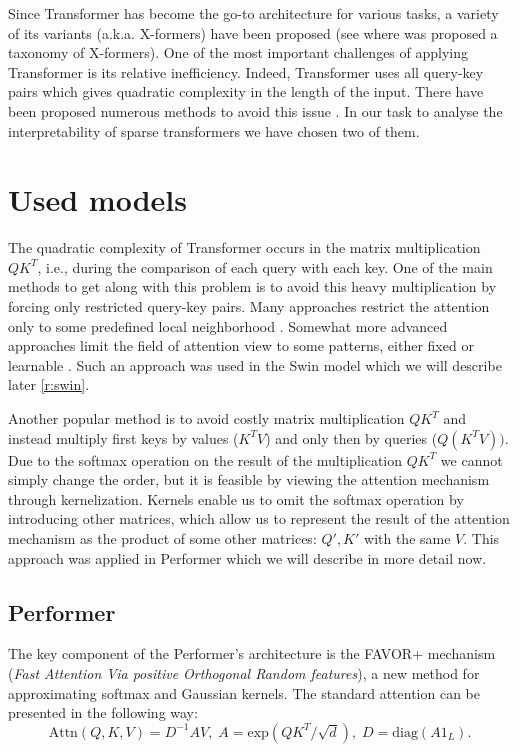 \documentclass[magisterska,en]{pracamgr}
\begin{document}
Since Transformer has become the go-to architecture for various tasks, a variety of its variants (a.k.a. X-formers) have been proposed (see \cite{DBLP:journals/corr/abs-2106-04554} where was proposed a taxonomy of X-formers). One of the most important challenges of applying Transformer is its relative inefficiency. Indeed, Transformer uses all query-key pairs which gives quadratic complexity in the length of the input. There have been proposed numerous methods to avoid this issue \cite{DBLP:journals/csur/TayDBM23}. In our task to analyse the interpretability of sparse transformers we have chosen two of them.

\chapter{Used models}\label{r:sparse_transformers}

The quadratic complexity of Transformer occurs in the matrix multiplication $QK^T$, i.e., during the comparison of each query with each key. One of the main methods to get along with this problem is to avoid this heavy multiplication by forcing only restricted query-key pairs. Many approaches restrict the attention only to some predefined local neighborhood \cite{DBLP:conf/icml/ParmarVUKSKT18}. Somewhat more advanced approaches limit the field of attention view to some patterns, either fixed or learnable \cite{DBLP:journals/csur/TayDBM23}. Such an approach was used in the Swin model \cite{DBLP:conf/iccv/LiuL00W0LG21} which we will describe later \ref{r:swin}.

Another popular method is to avoid costly matrix multiplication $QK^T$ and instead multiply first keys by values ($K^TV$) and only then by queries ($Q(K^TV))$. Due to the softmax operation on the result of the multiplication $QK^T$ we cannot simply change the order, but it is feasible by viewing the attention mechanism through kernelization. Kernels enable us to omit the softmax operation by introducing other matrices, which allow us to represent the result of the attention mechanism as the product of some other matrices: $Q', K'$ with the same $V$. This approach was applied in Performer \cite{DBLP:conf/iclr/ChoromanskiLDSG21} which we will describe in more detail now.


\section{Performer}\label{r:performer}


The key component of the Performer's architecture is the FAVOR+ mechanism (\textit{Fast Attention Via positive Orthogonal Random features}), a new method for approximating softmax and Gaussian kernels. The standard attention can be presented in the following way:
\begin{equation}
    \textrm{Attn}(Q, K, V) = D^{-1}AV, \; A=\textrm{exp}\left(QK^T/\sqrt{d}\right), \; 
    D = \textrm{diag}\left(A1_{L}\right).
\end{equation}\label{attention_equation}
\end{document}
